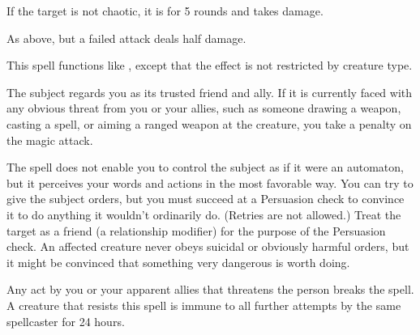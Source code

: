 \spellrng{\rngmed}
\begin{spellsuccess}
    If the target is not chaotic, it is \bewildered for 5 rounds and takes damage.
\end{spellsuccess}
\begin{spellfailure}
    As above, but a failed attack deals half damage.
\end{spellfailure}

\begin{spellsuccess}
  This spell functions like , except that the effect is not restricted by creature type.
\end{spellsuccess}

\spellrng{\rngmed}
\spelldur{\durlong}
\begin{spellsuccess}
    The subject regards you as its trusted friend and ally. If it is currently faced with any obvious threat from you or your allies, such as someone drawing a weapon, casting a spell, or aiming a ranged weapon at the creature, you take a  penalty on the magic attack.
  \par The spell does not enable you to control the subject as if it were an automaton, but it perceives your words and actions in the most favorable way. You can try to give the subject orders, but you must succeed at a Persuasion check to convince it to do anything it wouldn't ordinarily do. (Retries are not allowed.) Treat the target as a friend (a  relationship modifier) for the purpose of the Persuasion check. An affected creature never obeys suicidal or obviously harmful orders, but it might be convinced that something very dangerous is worth doing.
\end{spellsuccess}
\begin{spellnotes}
  Any act by you or your apparent allies that threatens the  person breaks the spell. A creature that resists this spell is immune to all further attempts by the same spellcaster for 24 hours.
\end{spellnotes}

